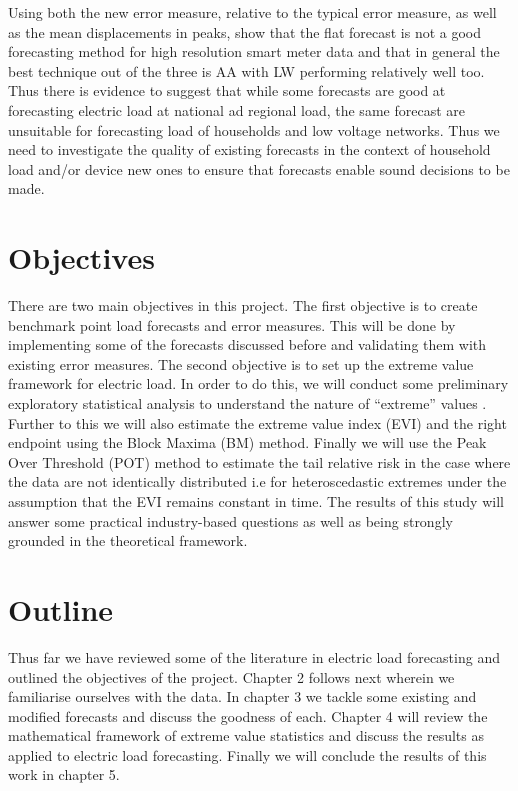 Using both the new error measure, relative to the typical error measure, as well as the mean displacements in peaks, \cite{dan14} show that the flat forecast is not a good forecasting method for high resolution smart meter data and that in general the best technique out of the three is AA with LW performing relatively well too. Thus there is evidence to suggest that while some forecasts are good at forecasting electric load at national ad regional load, the same forecast are unsuitable for forecasting load of households and low voltage networks. Thus we need to investigate the quality of existing forecasts in the context of household load and/or device new ones to ensure that forecasts enable sound decisions to be made.


\section{Objectives} \label{subsec:objectives}

There are two main objectives in this project. The first objective is to create benchmark point load forecasts and error measures. This will be done by implementing some of the forecasts discussed before and validating them with existing error measures. The second objective is to set up the extreme value framework for electric load. In order to do this, we will conduct some preliminary exploratory statistical analysis to understand the nature of ``extreme'' values . Further to this we will also estimate the extreme value index (EVI) and the right endpoint using the Block Maxima (BM) method. Finally we will use the Peak Over Threshold (POT) method to estimate the tail relative risk in the case where the data are not identically distributed i.e for heteroscedastic extremes under the assumption that the EVI remains constant in time. The results of this study will answer some practical industry-based questions as well as being strongly grounded in the theoretical framework.


\section{Outline}

Thus far we have reviewed some of the literature in electric load forecasting and outlined the objectives of the project. Chapter 2 follows next wherein we familiarise ourselves with the data. In chapter 3 we tackle some existing and modified forecasts and discuss the goodness of each. Chapter 4 will review the mathematical framework of extreme value statistics and discuss the results as applied to electric load forecasting. Finally we will conclude the results of this work in chapter 5.
